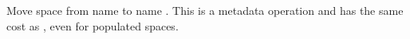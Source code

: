Move space from name  to name .  This is a metadata
operation and has the same cost as , even for populated spaces.
